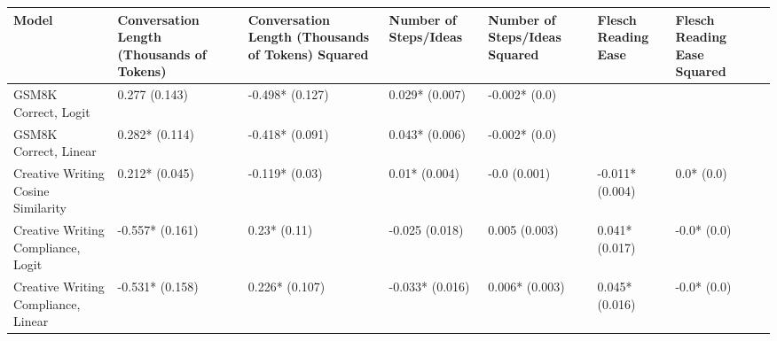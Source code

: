 \begin{tabular}{x{1.5cm}|x{0.75cm}|x{0.75cm}|x{0.75cm}|x{0.75cm}|x{0.75cm}|x{0.75cm}|x{0.75cm}}
\toprule
\hline
Model & Conversation Length (Thousands of Tokens) & Conversation Length (Thousands of Tokens) Squared & Number of Steps/Ideas & Number of Steps/Ideas Squared & Flesch Reading Ease & Flesch Reading Ease Squared \\
\hline
\midrule
GSM8K Correct, Logit & 0.277 (0.143) & -0.498* (0.127) & 0.029* (0.007) & -0.002* (0.0) &  &  \\
\hline
GSM8K Correct, Linear & 0.282* (0.114) & -0.418* (0.091) & 0.043* (0.006) & -0.002* (0.0) &  &  \\
\hline
Creative Writing Cosine Similarity & 0.212* (0.045) & -0.119* (0.03) & 0.01* (0.004) & -0.0 (0.001) & -0.011* (0.004) & 0.0* (0.0) \\
\hline
Creative Writing Compliance, Logit & -0.557* (0.161) & 0.23* (0.11) & -0.025 (0.018) & 0.005 (0.003) & 0.041* (0.017) & -0.0* (0.0) \\
\hline
Creative Writing Compliance, Linear & -0.531* (0.158) & 0.226* (0.107) & -0.033* (0.016) & 0.006* (0.003) & 0.045* (0.016) & -0.0* (0.0) \\
\hline
\bottomrule
\end{tabular}
